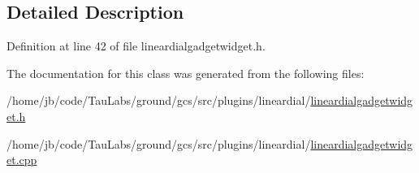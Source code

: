 \subsection{\-Detailed \-Description}


\-Definition at line 42 of file lineardialgadgetwidget.\-h.



\-The documentation for this class was generated from the following files\-:\begin{DoxyCompactItemize}
\item 
/home/jb/code/\-Tau\-Labs/ground/gcs/src/plugins/lineardial/\hyperlink{lineardialgadgetwidget_8h}{lineardialgadgetwidget.\-h}\item 
/home/jb/code/\-Tau\-Labs/ground/gcs/src/plugins/lineardial/\hyperlink{lineardialgadgetwidget_8cpp}{lineardialgadgetwidget.\-cpp}\end{DoxyCompactItemize}
